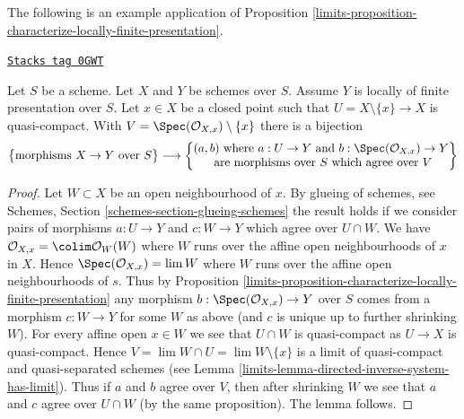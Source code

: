The following is an example application of
Proposition \ref{limits-proposition-characterize-locally-finite-presentation}.

\begin{lemma}
\label{limits-lemma-morphism-glueing-near-closed-point}
\href{https://stacks.math.columbia.edu/tag/0GWT}{\texttt{Stacks tag 0GWT}}

Let $S$ be a scheme. Let $X$ and $Y$ be schemes over $S$.
Assume $Y$ is locally of finite presentation over $S$.
Let $x \in X$ be a closed point such that
$U = X \setminus \{x\} \to X$ is quasi-compact. With
$V = \Spec(\mathcal{O}_{X, x}) \setminus \{x\}$ there is
a bijection
$$
\left\{
\begin{matrix}
\text{morphisms }X \to Y\text{ over }S
\end{matrix}
\right\}
\longrightarrow
\left\{
\begin{matrix}
(a, b)\text{ where }
a : U \to Y\text{ and }b : \Spec(\mathcal{O}_{X, x}) \to Y\\
\text{ are morphisms over }S
\text{ which agree over }V
\end{matrix}
\right\}
$$
\end{lemma}

\begin{proof}

Let $W \subset X$ be an open neighbourhood of $x$. By
glueing of schemes, see
Schemes, Section \ref{schemes-section-glueing-schemes}
the result holds if we consider pairs of morphisms
$a : U \to Y$ and $c : W \to Y$ which agree over $U \cap W$.
We have $\mathcal{O}_{X, x} = \colim \mathcal{O}_W(W)$ where
$W$ runs over the affine open neighbourhoods of $x$ in $X$.
Hence $\Spec(\mathcal{O}_{X, x}) = \lim W$ where $W$
runs over the affine open neighbourhoods of $s$.
Thus by
Proposition \ref{limits-proposition-characterize-locally-finite-presentation}
any morphism $b : \Spec(\mathcal{O}_{X, x}) \to Y$
over $S$ comes from a morphism $c : W \to Y$ for some $W$ as above
(and $c$ is unique up to further shrinking $W$).
For every affine open $x \in W$ we see that $U \cap W$
is quasi-compact as $U \to X$ is quasi-compact.
Hence $V = \lim W \cap U = \lim W \setminus \{x\}$ is a limit of
quasi-compact and quasi-separated schemes (see
Lemma \ref{limits-lemma-directed-inverse-system-has-limit}).
Thus if $a$ and $b$ agree over $V$, then after shrinking $W$
we see that $a$ and $c$ agree over $U \cap W$ (by the same
proposition). The lemma follows.
\end{proof}

